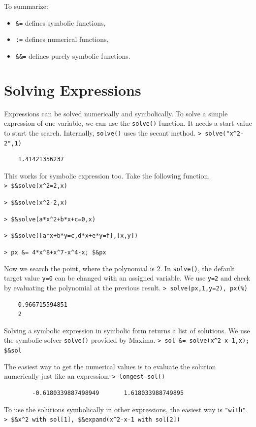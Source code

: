 \documentclass[11pt, a4paper]{article}
\newcommand{\emtcmd}[1]{\noindent\texttt{\textcolor{emtcommand}{>}\ #1}\par\smallskip}
\begin{document}
To summarize:
\begin{itemize}
    \item \texttt{\&=} defines symbolic functions,
    \item \texttt{:=} defines numerical functions,
    \item \texttt{\&\&=} defines purely symbolic functions.
\end{itemize}

\section*{Solving Expressions}

Expressions can be solved numerically and symbolically. To solve a simple expression of one variable, we can use the \texttt{solve()} function. It needs a start value to start the search. Internally, \texttt{solve()} uses the secant method.
\emtcmd{solve("x\^{}2-2",1)}
\begin{verbatim}
    1.41421356237
\end{verbatim}

This works for symbolic expression too. Take the following function.
\emtcmd{\$\&solve(x\^{}2=2,x)}
\emtcmd{\$\&solve(x\^{}2-2,x)}
\emtcmd{\$\&solve(a*x\^{}2+b*x+c=0,x)}
\emtcmd{\$\&solve([a*x+b*y=c,d*x+e*y=f],[x,y])}
\emtcmd{px \&= 4*x\^{}8+x\^{}7-x\^{}4-x; \$\&px}

Now we search the point, where the polynomial is 2. In \texttt{solve()}, the default target value \texttt{y=0} can be changed with an assigned variable. We use \texttt{y=2} and check by evaluating the polynomial at the previous result.
\emtcmd{solve(px,1,y=2), px(\%)}
\begin{verbatim}
    0.966715594851
    2
\end{verbatim}

Solving a symbolic expression in symbolic form returns a list of solutions. We use the symbolic solver \texttt{solve()} provided by Maxima.
\emtcmd{sol \&= solve(x\^{}2-x-1,x); \$\&sol}

The easiest way to get the numerical values is to evaluate the solution numerically just like an expression.
\emtcmd{longest sol()}
\begin{verbatim}
        -0.6180339887498949       1.618033988749895
\end{verbatim}

To use the solutions symbolically in other expressions, the easiest way is \texttt{"with"}.
\emtcmd{\$\&x\^{}2 with sol[1], \$\&expand(x\^{}2-x-1 with sol[2])}
\end{document}
